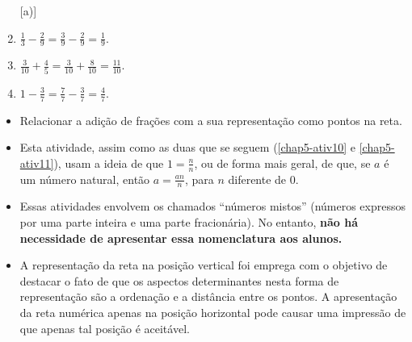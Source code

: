 \begin{multicols}{2}
\begin{solucao}{}{}

\begin{enumerate} [\quad a)] %
    \item             $\frac{1}{3} - \frac{2}{9} = \frac{3}{9} - \frac{2}{9} = \frac{1}{9}$.
    \item             $\frac{3}{10}+\frac{4}{5} = \frac{3}{10}+\frac{8}{10} =\frac{11}{10}$.
    \item             $1 - \frac{3}{7} = \frac{7}{7} - \frac{3}{7} = \frac{4}{7}$.
\end{enumerate} %


\end{solucao}



\end{multicols}

\begin{objetivos}[label=chap5-ativ9]{}{}

\begin{itemize} %
  \item     Relacionar a adição de frações com a sua representação como pontos na reta.
\end{itemize} %
\vspace{.15cm}

\end{objetivos}

\begin{orientacoes}{}{}

\begin{itemize} %
  \item     Esta atividade, assim como as duas que se seguem (\ref{chap5-ativ10} e \ref{chap5-ativ11}),   usam a ideia de que     $1 = \frac{n}{n}$, ou de forma mais geral, de que, se     $a$     é um número natural, então     $a = \frac{an}{n}$, para     $n$     diferente de 0.
  \item Essas atividades envolvem os chamados ``números mistos'' (números expressos por uma parte inteira e uma parte fracionária). No entanto, {\bf não há necessidade de apresentar essa nomenclatura aos alunos.}
\item A representação da reta na posição vertical foi emprega com o objetivo de destacar o fato de que os aspectos determinantes nesta forma de representação são a ordenação e a distância entre os pontos. A apresentação da reta numérica apenas na posição horizontal pode causar uma impressão de que apenas tal posição é aceitável.

\end{itemize} %
\end{orientacoes}


